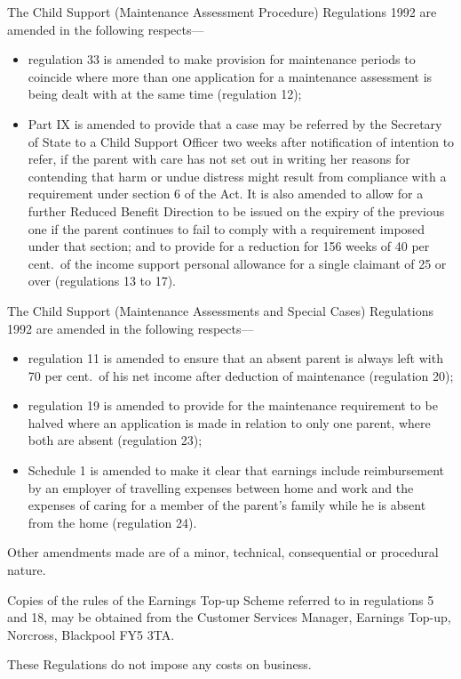 \documentclass[12pt,a4paper]{article}
\begin{document}
  The Child Support (Maintenance Assessment Procedure) Regulations 1992 are amended in the following respects—
\begin{itemize}
\item regulation 33 is amended to make provision for maintenance periods to coincide where more than one application for a maintenance assessment is being dealt with at the same time (regulation 12);

\item Part IX is amended to provide that a case may be referred by the Secretary of State to a Child Support Officer two weeks after notification of intention to refer, if the parent with care has not set out in writing her reasons for contending that harm or undue distress might result from compliance with a requirement under section 6 of the Act. It is also amended to allow for a further Reduced Benefit Direction to be issued on the expiry of the previous one if the parent continues to fail to comply with a requirement imposed under that section; and to provide for a reduction for 156 weeks of 40 per cent.\ of the income support personal allowance for a single claimant of 25 or over (regulations 13 to 17).
\end{itemize}

  The Child Support (Maintenance Assessments and Special Cases) Regulations 1992 are amended in the following respects—
\begin{itemize}
\item regulation 11 is amended to ensure that an absent parent is always left with 70 per cent.\ of his net income after deduction of maintenance (regulation 20);

\item regulation 19 is amended to provide for the maintenance requirement to be halved where an application is made in relation to only one parent, where both are absent (regulation 23);

\item Schedule 1 is amended to make it clear that earnings include reimbursement by an employer of travelling expenses between home and work and the expenses of caring for a member of the parent’s family while he is absent from the home (regulation 24).
\end{itemize}

  Other amendments made are of a minor, technical, consequential or procedural nature.

  Copies of the rules of the Earnings Top-up Scheme referred to in regulations 5 and 18, may be obtained from the Customer Services Manager, Earnings Top-up, Norcross, Blackpool \textsc{FY5 3TA}.

  These Regulations do not impose any costs on business.
\end{document}
